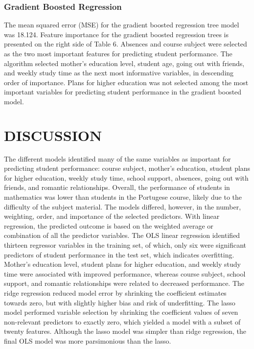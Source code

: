 \documentclass[sigconf]{acmart}
\begin{document}

\subsubsection{Gradient Boosted Regression}

The mean squared error (MSE) for the gradient boosted regression tree model  
was 18.124. Feature importance for the gradient boosted regression trees is 
presented on the right side of Table 6. Absences and course subject were 
selected as the two most important features for predicting student performance. 
The algorithm selected mother's education level, student age, going out with 
friends, and weekly study time as the next most informative variables, in 
descending order of importance. Plans for higher education was not selected 
among the most important variables for predicting student performance in 
the gradient boosted model.   


\section{DISCUSSION}

The different models identified many of the same variables as important for 
predicting student performance: course subject, mother's education, student 
plans for higher education, weekly study time, school support, absences, 
going out with friends, and romantic relationships. Overall, the performance of
students in mathematics was lower than students in the Portugese course, likely 
due to the difficulty of the subject material. The models differed, however, 
in the number, weighting, order, and importance of the selected predictors. 
With linear regression, the predicted outcome is based on the weighted average 
or combination of all the predictor variables. The OLS linear regression 
identified thirteen regressor variables in the training set, of which, only 
six were significant predictors of student performance in the test set, which 
indicates overfitting. Mother's education level, student plans for higher 
education, and weekly study time were associated with improved performance, 
whereas course subject, school support, and romantic relationships were related 
to decreased performance. The ridge regression reduced model error by shrinking 
the coefficient estimates towards zero, but with slightly higher bias and risk 
of underfitting. The lasso model performed variable selection by shrinking the 
coefficient values of seven non-relevant predictors to exactly zero, which 
yielded a model with a subset of twenty features. Although the lasso model 
was simpler than ridge regression, the final OLS model was more parsimonious 
than the lasso. 
\end{document}
